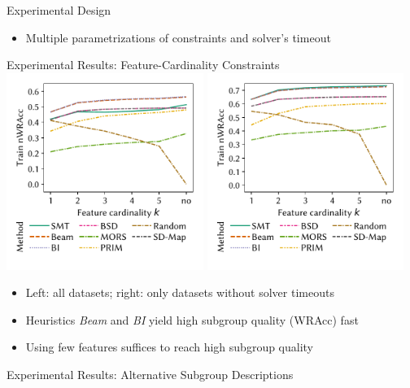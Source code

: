 \documentclass[USenglish]{article} %
\begin{document}
\begin{minipage}[t]{0.49\textwidth}
\begin{standardbox}{Experimental Design}
\begin{itemize}
			\item Multiple parametrizations of constraints and solver's timeout
		\end{itemize}
	\end{standardbox}
	\vspace{10pt}
	\begin{standardbox}{Experimental Results: Feature-Cardinality Constraints}
		\centering
		\includegraphics[width=0.48\textwidth, trim=10 25 10 10, clip]{plots/csd-cardinality-train-nwracc-all-datasets.pdf}
		\hfill
		\includegraphics[width=0.48\textwidth, trim=10 25 10 10, clip]{plots/csd-cardinality-train-nwracc-no-timeout-datasets.pdf}
		\begin{itemize}
			\item Left: all datasets; right: only datasets without solver timeouts
			\item Heuristics \emph{Beam} and \emph{BI} yield high subgroup quality (WRAcc) fast
			\item Using few features suffices to reach high subgroup quality
		\end{itemize}
	\end{standardbox}
	\vspace{10pt}
	\begin{standardbox}{Experimental Results: Alternative Subgroup Descriptions}

\end{standardbox}
\end{minipage}
\end{document}

